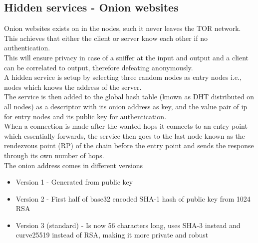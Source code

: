 \documentclass[12pt, a4paper]{article}
\begin{document}
		\subsection{Hidden services - Onion websites}
			Onion websites exists on in the nodes, such it never leaves the TOR network.\\
			This achieves that either the client or server know each other if no authentication.\\
			This will ensure privacy in case of a sniffer at the input and output and a client can be correlated to output, therefore defeating anonymously.\\
			A hidden service is setup by selecting three random nodes as entry nodes i.e., nodes which knows the address of the server.\\
			The service is then added to the global hash table (known as DHT distributed on all nodes) as a descriptor with its onion address as key, and the value pair of ip for entry nodes and its public key for authentication.\\
			When a connection is made after the wanted hops it connects to an entry point which essentially forwards, the service then goes to the last node known as the rendezvous point (RP) of the chain before the entry point and sends the response through its own number of hops.\\
			The onion address comes in different versions
			\begin{itemize}
				\item Version 1 - Generated from public key
				\item Version 2 - First half of base32 encoded SHA-1 hash of public key from 1024 RSA 
				\item Version 3 (standard) - Is now 56 characters long, uses SHA-3 instead and curve25519 instead of RSA, making it more private and robust
			\end{itemize}
			
			
			
			
\end{document}
